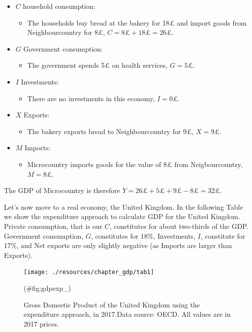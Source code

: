 \documentclass[
]{book}
\providecommand{\tightlist}{%
  \setlength{\itemsep}{0pt}\setlength{\parskip}{0pt}}
\begin{document}
\begin{itemize}
\tightlist
\item
  \(C\) household consumption:

  \begin{itemize}
  \tightlist
  \item
    The households buy bread at the bakery for 18£ and import goods from Neighbourcountry for 8£, \(C=8£+18£=26£\).
  \end{itemize}
\item
  \(G\) Government consumption:

  \begin{itemize}
  \tightlist
  \item
    The government spends 5£ on health services, \(G=5£\).
  \end{itemize}
\item
  \(I\) Investments:

  \begin{itemize}
  \tightlist
  \item
    There are no investments in this economy, \(I=0£\).
  \end{itemize}
\item
  \(X\) Exports:

  \begin{itemize}
  \tightlist
  \item
    The bakery exports bread to Neighbourcountry for 9£, \(X=9£\).
  \end{itemize}
\item
  \(M\) Imports:

  \begin{itemize}
  \tightlist
  \item
    Microcountry imports goods for the value of 8£ from Neigbourcountry, \(M=8£\).
  \end{itemize}
\end{itemize}

The GDP of Microcountry is therefore \(Y=26£+5£+9£-8£=32£\).

Let's now move to a real economy, the United Kingdom. In the following Table we show the expenditure approach to calculate GDP for the United Kingdom. Private consumption, that is our \(C\), constitutes for about two-thirds of the GDP. Government consumption, \(G\), constitutes for 18\%, Investments, \(I\), constitute for 17\%, and Net exports are only slightly negative (as Imports are larger than Exports).

\begin{figure}

{\centering \texttt{[image: ./resources/chapter\_gdp/tab1]} 

}

\caption{Gross Domestic Product of the United Kingdom using the expenditure approach, in 2017.Data source: OECD. All values are in 2017 prices.}(\#fig:gdpexp_)
\end{figure}
\end{document}
